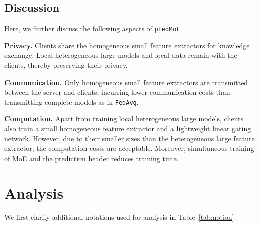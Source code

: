\documentclass[sigconf]{acmart}
\newcommand{\hetero}{heterogeneous }
\newcommand{\homo}{homogeneous }
\newcommand{\persN}{personalization }
\newcommand{\genN}{generalization }
\newcommand{\methodname}{{\tt{pFedMoE}}}
\begin{document}
\subsection{Discussion}

Here, we further discuss the following aspects of \methodname{}.

\indent \textbf{Privacy.} Clients share the \homo small feature extractors for knowledge exchange. Local \hetero large models and local data remain with the clients, thereby preserving their privacy.

\textbf{Communication.} Only \homo small feature extractors are transmitted between the server and clients, incurring lower communication costs than transmitting complete models as in {\tt{FedAvg}}.

\textbf{Computation.} Apart from training local \hetero large models, clients also train a small \homo feature extractor and a lightweight linear gating network. However, due to their smaller sizes than the \hetero large feature extractor, the computation costs are acceptable. Moreover, simultaneous training of MoE and the prediction header reduces training time.


\section{Analysis}
We first clarify additional notations used for analysis in Table~\ref{tab:notion}.

\end{document}
